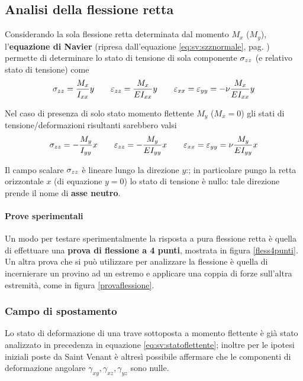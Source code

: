 	\subsection{Analisi della flessione retta}
		\begin{concetto}
			Considerando la sola flessione retta determinata dal momento $M_x$ ($M_y$), l'\textbf{equazione di Navier} (ripresa dall'equazione \ref{eq:sv:szznormale}, pag. \pageref{eq:sv:szznormale}) permette di determinare lo stato di tensione di sola componente $\sigma_{zz}$ (e relativo stato di tensione) come
			\begin{equation} \label{eq:sv:statoflettente}
				\sigma_{zz} = \frac {M_x} {I_{xx}} y \qquad \varepsilon_{zz} = \frac {M_x} {EI_{xx}} y \qquad \varepsilon_{xx} = \varepsilon_{yy} = -\nu \frac {M_x}{EI_{xx}} y
			\end{equation} 
		\end{concetto}
		\begin{osservazione}
			Nel caso di presenza di solo stato momento flettente $M_y$ ($M_x=0$) gli stati di tensione/deformazioni risultanti sarebbero valsi
			\[ \sigma_{zz} = -\frac {M_y} {I_{yy}} x \qquad \varepsilon_{zz} =-\frac {M_y} {EI_{yy}} x \qquad \varepsilon_{xx} = \varepsilon_{yy} = \nu \frac {M_y}{EI_{yy}} x \]
		\end{osservazione}
		\begin{concetto} \label{conc:sv:asseneutro}
			Il campo scalare $\sigma_{zz}$ è lineare lungo la direzione $y$:; in particolare pungo la retta orizzontale $x$ (di equazione $y=0$) lo stato di tensione è nullo: tale direzione prende il nome di \textbf{asse neutro}.
		\end{concetto}
	
		\paragraph{Prove sperimentali} Un modo per testare sperimentalmente la risposta a pura flessione retta è quella di effettuare una \textbf{prova di flessione a 4 punti}, mostrata in figura \ref{fless4punti}. Un altra prova che si può utilizzare per analizzare la flessione è quella di incernierare un provino ad un estremo e applicare una coppia di forze sull'altra estremità, come in figura \ref{provaflessione}.
		
		
	\subsubsection{Campo di spostamento}
		Lo stato di deformazione di una trave sottoposta a momento flettente è già stato analizzato in precedenza in equazione \ref{eq:sv:statoflettente}; inoltre per le ipotesi iniziali poste da Saint Venant è altresì possibile affermare che le componenti di deformazione angolare $\gamma_{xy}, \gamma_{xz},\gamma_{yz}$ sono nulle.
		
